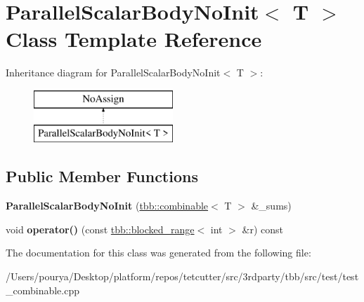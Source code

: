 \hypertarget{classParallelScalarBodyNoInit}{}\section{Parallel\+Scalar\+Body\+No\+Init$<$ T $>$ Class Template Reference}
\label{classParallelScalarBodyNoInit}
Inheritance diagram for Parallel\+Scalar\+Body\+No\+Init$<$ T $>$\+:\begin{figure}[H]
\begin{center}
\leavevmode
\includegraphics[height=2.000000cm]{classParallelScalarBodyNoInit}
\end{center}
\end{figure}
\subsection*{Public Member Functions}
\begin{DoxyCompactItemize}
\item 
\hypertarget{classParallelScalarBodyNoInit_a301920c4a397d7d8b0f17350d67d9c70}{}{\bfseries Parallel\+Scalar\+Body\+No\+Init} (\hyperlink{classtbb_1_1combinable}{tbb\+::combinable}$<$ T $>$ \&\+\_\+sums)\label{classParallelScalarBodyNoInit_a301920c4a397d7d8b0f17350d67d9c70}

\item 
\hypertarget{classParallelScalarBodyNoInit_a9c2ac6354c6cca2adc70189aad4b4d4d}{}void {\bfseries operator()} (const \hyperlink{classtbb_1_1blocked__range}{tbb\+::blocked\+\_\+range}$<$ int $>$ \&r) const \label{classParallelScalarBodyNoInit_a9c2ac6354c6cca2adc70189aad4b4d4d}

\end{DoxyCompactItemize}


The documentation for this class was generated from the following file\+:\begin{DoxyCompactItemize}
\item 
/\+Users/pourya/\+Desktop/platform/repos/tetcutter/src/3rdparty/tbb/src/test/test\+\_\+combinable.\+cpp\end{DoxyCompactItemize}
